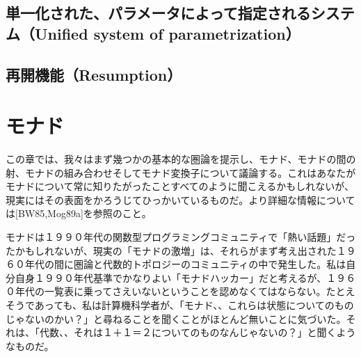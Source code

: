 \documentclass[11pt, oneside]{jsbook}   	%
\begin{document}












\section{単一化された、パラメータによって指定されるシステム（Unified system of parametrization）}
\section{再開機能（Resumption）}


\newpage
\chapter{モナド}
この章では、我々はまず幾つかの基本的な圏論を提示し、モナド、モナドの間の射、モナドの組み合わせそしてモナド変換子について議論する。これはあなたがモナドについて常に知りたがったことすべてのように聞こえるかもしれないが、現実にはその表面をかろうじてひっかいているものだ。より詳細な情報については[BW85,Mog89a]を参照のこと。

モナドは１９９０年代の関数型プログラミングコミュニティで「熱い話題」だったかもしれないが、現実の「モナドの激増」は、それらがまず考え出された１９６０年代の間に圏論と代数的トポロジーのコミュニティの中で発生した。私は自分自身１９９０年代基準でかなりよい「モナドハッカー」だと考えるが、１９６０年代の一覧表に乗ってさえいないということを認めなくてはならない。たとえそうであっても、私は計算機科学者が、「モナド、、これらは状態についてのものじゃないのかい？」と尋ねることを聞くことがほとんど無いことに気づいた。それは、「代数、、それは１＋１＝２についてのものなんじゃないの？」と聞くようなものだ。
\end{document}
